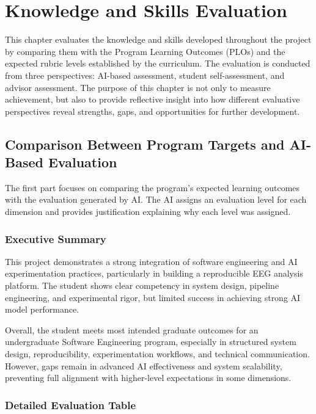 \chapter{Knowledge and Skills Evaluation}
\label{chap:knowledge-skills-evaluation}

\noindent
This chapter evaluates the knowledge and skills developed throughout the project by comparing
them with the Program Learning Outcomes (PLOs) and the expected rubric levels established
by the curriculum. The evaluation is conducted from three perspectives: AI-based assessment,
student self-assessment, and advisor assessment. The purpose of this chapter is not only to
measure achievement, but also to provide reflective insight into how different evaluative
perspectives reveal strengths, gaps, and opportunities for further development.

\section{Comparison Between Program Targets and AI-Based Evaluation}
\label{sec:plo-ai-evaluation}

The first part focuses on comparing the program's expected learning outcomes with the
evaluation generated by AI. The AI assigns an evaluation level for each dimension and provides
justification explaining why each level was assigned.

\subsection{Executive Summary}
\label{subsec:ai-executive-summary}

This project demonstrates a strong integration of software engineering and AI experimentation
practices, particularly in building a reproducible EEG analysis platform. The student shows
clear competency in system design, pipeline engineering, and experimental rigor, but limited
success in achieving strong AI model performance.

Overall, the student meets most intended graduate outcomes for an undergraduate Software
Engineering program, especially in structured system design, reproducibility, experimentation
workflows, and technical communication. However, gaps remain in advanced AI effectiveness
and system scalability, preventing full alignment with higher-level expectations in some
dimensions.

\subsection{Detailed Evaluation Table}
\label{subsec:ai-evaluation-table}

